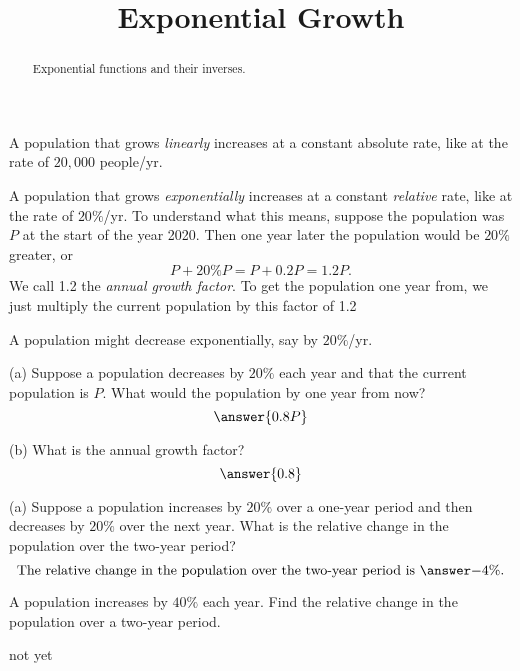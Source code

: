 \documentclass{ximera}
\title{Exponential Growth}
\begin{document}
\begin{abstract}
Exponential functions and their inverses.
\end{abstract}
\maketitle

A population that grows \emph{linearly} increases at a constant absolute rate, like at the rate of $20,000$ people/yr. 

A population that grows \emph{exponentially} increases at a constant \emph{relative} rate, like at the rate of $20\%$/yr. To understand what this means, suppose the population was $P$ at the start of the year 2020. Then one year later the population would be $20\%$ greater, or 
\[
   P + 20\% P  = P + 0.2 P = 1.2P .
\]
We call 1.2 the \emph{annual growth factor}. To get the population one year from, we just multiply the current population by this factor of 1.2

A population might decrease exponentially, say by $20\%$/yr. 

\begin{question}  \label{Q1:ExponentialG}
(a) Suppose a population decreases by $20\%$ each year and that the current population is $P$. What would the population by one year from now?  
\[
\answer{0.8P}
\]

(b) What is the annual growth factor?
\[
   \answer{0.8}
\]

\end{question}

\begin{question}  \label{Q2:ExponentialG}
(a) Suppose a population increases by $20\%$ over a one-year period and then decreases by $20\%$ over the next year. What is the relative change in the population over the two-year period?
\[
   \text{The relative change in the population over the two-year period is }   \answer{-4\%} .
\]

\end{question}

\begin{question}  \label{Q3:ExponentialG}
A population increases by $40\%$ each year. Find the relative change in the population over a two-year period. 
\begin{multipleChoice}  
\end{multipleChoice}  
\end{question}



\begin{example}
not yet
\end{example}
\end{document}
